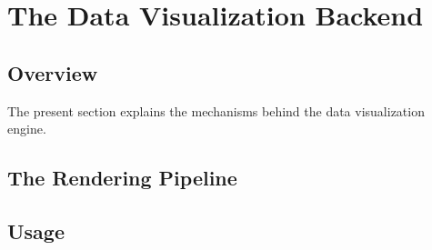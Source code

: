 %
%
%


\section{The Data Visualization Backend}
\label{section-dv-backend}

\subsection{Overview}

The present section explains the mechanisms behind the data
visualization engine. 

\subsection{The Rendering Pipeline}

\subsection{Usage}

